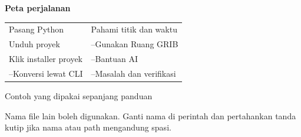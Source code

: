 \documentclass[11pt,a4paper]{article}
\begin{document}
\textbf{Peta perjalanan}\par
\begin{tabular}{@{}p{76mm}p{76mm}@{}}
\pageref{pg:python}\quad Pasang Python & \pageref{pg:semantics}\quad Pahami titik dan waktu\\[4pt]
\pageref{pg:download}\quad Unduh proyek & \pageref{pg:web-start}--\pageref{pg:web-results}\quad Gunakan Ruang GRIB\\[4pt]
\pageref{pg:packages}\quad Klik installer proyek & \pageref{pg:codex}--\pageref{pg:ai-browser}\quad Bantuan AI\\[4pt]
\pageref{pg:convert}--\pageref{pg:output}\quad Konversi lewat CLI & \pageref{pg:troubleshooting}--\pageref{pg:references}\quad Masalah dan verifikasi
\end{tabular}\par
\vfill
\begin{panel}{Contoh yang dipakai sepanjang panduan}
\par
Nama file lain boleh digunakan. Ganti nama di perintah dan pertahankan tanda
kutip jika nama atau path mengandung spasi.
\end{panel}
\end{document}
